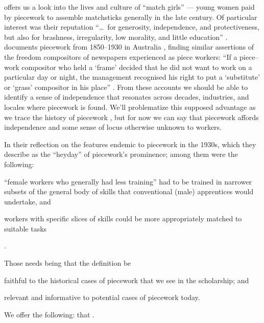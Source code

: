 \documentclass[trackingWork]{subfiles}
\begin{document}
\citeauthor{10.2307/3827491} offers us a look into the lives and culture of ``match girls''
--- young women paid by piecework to assemble matchsticks generally in the late  century.
Of particular interest was their reputation ``\dots~for generosity, independence, and protectiveness,
but also for brashness, irregularity, low morality, and little education''
\cite{10.2307/3827491}.
\citeauthor{10.2307/27508091} documents piecework from 1850--1930 in Australia%
, finding similar assertions of the freedom compositors of newspapers experienced as piece workers:
``If a piece--work compositor who held a `frame' decided that he did not want to work on a particular day or night,
the management recognised his right to put a `substitute' or `grass' compositor in his place''
\cite{10.2307/27508091}.
From these accounts we should be able to identify
a sense of independence that
resonates across decades, industries, and locales where piecework is found.
We'll problematize this supposed advantage as we trace the history of piecework%
, but for now we can say that piecework affords
independence and some sense of locus 
otherwise unknown to workers.


In their reflection on the features endemic to piecework in the 1930s,
which they describe as the ``heyday'' of piecework's prominence;
among them were the following:
\begin{inlinelist}
\item ``female workers who generally had less training'' had to be trained in narrower subsets of the general body of skills that conventional (male) apprentices would undertake, and
\item workers with specific slices of skills could be more appropriately matched to suitable tasks
\end{inlinelist}
\cite{hart2013rise}. 

 
Those needs being that the definition be
\begin{inlinelist}
\item faithful to the historical cases of piecework that we see in the scholarship; and
\item relevant and informative to potential cases of piecework today.
\end{inlinelist}
We offer the following:
that \pieceworkdefinition.
\end{document}
